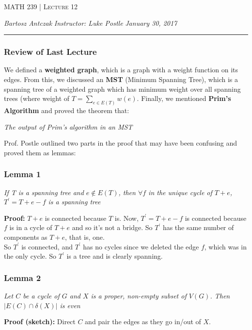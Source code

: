 \documentclass{report}
\newcommand{\lectureNum}{12}
\newcommand{\curDate}{January 30, 2017}
\newcommand{\course}{MATH 239}
\newcommand{\instructor}{Luke Postle}
\begin{document}
\begin{center}
\begin{Large}
\textsc{\course{} | Lecture \lectureNum{}}
\end{Large}
\end{center} 
\noindent \textit{Bartosz Antczak} \hfill
\textit{Instructor: \instructor{}} \hfill
\textit{\curDate{}}
\rule{\textwidth}{0.4pt}

\subsubsection{Review of Last Lecture}
We defined a \textbf{weighted graph}, which is a graph with a weight function on its edges. From this, we discussed an \textbf{MST} (Minimum Spanning Tree), which is a spanning tree of a weighted graph which has minimum weight over all spanning trees (where weight of $T = \displaystyle \sum_{e \in E(T)} w(e)$. Finally, we mentioned \textbf{Prim's Algorithm} and proved the theorem that:
\begin{center}
\textit{The output of Prim's algorithm in an MST}
\end{center}
Prof. Postle outlined two parts in the proof that may have been confusing and proved them as lemmas:
\subsubsection{Lemma 1}
\begin{center}
\textit{If T is a spanning tree and $e \not\in E(T)$, then $\forall f$ in the unique cycle of $T+e$, $T^\prime = T + e - f$ is a spanning tree}
\end{center}
\textbf{Proof:} $T+e$ is connected because $T$ is. Now, $T^\prime = T + e - f$ is connected because $f$ is in a cycle of $T+e$ and so it's not a bridge. So $T^\prime$ has the same number of components as $T+e$, that is, one.\\
So $T^\prime$ is connected, and $T^\prime$ has no cycles since we deleted the edge $f$, which was in the only cycle. So $T^\prime$ is a tree and is clearly spanning.
\subsubsection{Lemma 2}
\begin{center}
\textit{Let $C$ be a cycle of $G$ and $X$ is a proper, non-empty subset of $V(G)$. Then $\vert E(C) \cap \delta(X) \vert$ is even}
\end{center}
\textbf{Proof (sketch):} Direct $C$ and pair the edges as they go in/out of $X$.
\end{document}

